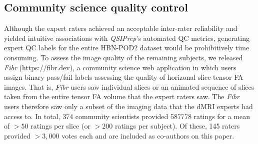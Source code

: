 \documentclass[fleqn,10pt]{wlscirep}
\begin{document}
\subsection*{Community science quality control}

Although the expert raters achieved an acceptable inter-rater reliability and
yielded intuitive associations with \emph{QSIPrep}'s automated QC metrics,
generating expert QC labels for the entire HBN-POD2 dataset would be
prohibitively time consuming. To assess the image quality of the remaining
subjects, we released \emph{Fibr} (\url{https://fibr.dev}), a community science
web application in which users assign binary pass/fail labels assessing the
quality of horizonal slice tensor FA images. That is, \emph{Fibr} users saw
individual slices or an animated sequence of slices taken from the entire tensor
FA volume that the expert raters saw. The \emph{Fibr} users therefore saw only a
subset of the imaging data that the dMRI experts had access to. In total,
\num{374} community scientists provided \num{587778} ratings for a mean of $>50$
ratings per slice (or $>200$ ratings per subject). Of these, \num{145} raters
provided $>3,000$ votes each and are included as co-authors on this paper.
\end{document}
